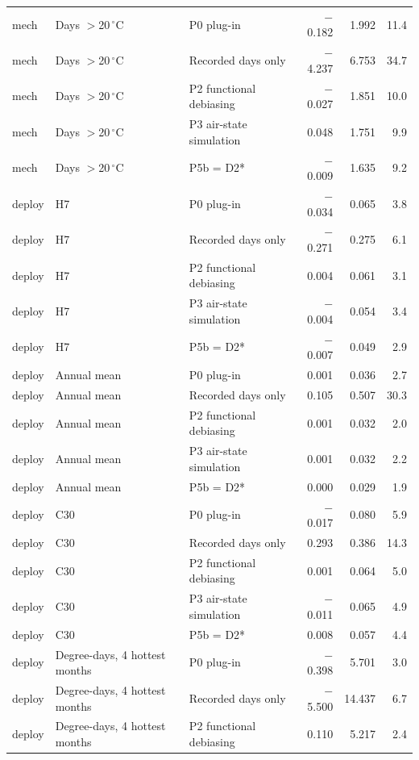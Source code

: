 \begin{table}
{\begin{tabular}{lllrrr}
mech & Days $>$20\,$^{\circ}$C & P0 plug-in & \ensuremath{-}0.182 & 1.992 & 11.4 \\
mech & Days $>$20\,$^{\circ}$C & Recorded days only & \ensuremath{-}4.237 & 6.753 & 34.7 \\
mech & Days $>$20\,$^{\circ}$C & P2 functional debiasing & \ensuremath{-}0.027 & 1.851 & 10.0 \\
mech & Days $>$20\,$^{\circ}$C & P3 air-state simulation & 0.048 & 1.751 & 9.9 \\
mech & Days $>$20\,$^{\circ}$C & P5b = D2* & \ensuremath{-}0.009 & 1.635 & 9.2 \\
deploy & H7 & P0 plug-in & \ensuremath{-}0.034 & 0.065 & 3.8 \\
deploy & H7 & Recorded days only & \ensuremath{-}0.271 & 0.275 & 6.1 \\
deploy & H7 & P2 functional debiasing & 0.004 & 0.061 & 3.1 \\
deploy & H7 & P3 air-state simulation & \ensuremath{-}0.004 & 0.054 & 3.4 \\
deploy & H7 & P5b = D2* & \ensuremath{-}0.007 & 0.049 & 2.9 \\
deploy & Annual mean & P0 plug-in & 0.001 & 0.036 & 2.7 \\
deploy & Annual mean & Recorded days only & 0.105 & 0.507 & 30.3 \\
deploy & Annual mean & P2 functional debiasing & 0.001 & 0.032 & 2.0 \\
deploy & Annual mean & P3 air-state simulation & 0.001 & 0.032 & 2.2 \\
deploy & Annual mean & P5b = D2* & 0.000 & 0.029 & 1.9 \\
deploy & C30 & P0 plug-in & \ensuremath{-}0.017 & 0.080 & 5.9 \\
deploy & C30 & Recorded days only & 0.293 & 0.386 & 14.3 \\
deploy & C30 & P2 functional debiasing & 0.001 & 0.064 & 5.0 \\
deploy & C30 & P3 air-state simulation & \ensuremath{-}0.011 & 0.065 & 4.9 \\
deploy & C30 & P5b = D2* & 0.008 & 0.057 & 4.4 \\
deploy & Degree-days, 4 hottest months & P0 plug-in & \ensuremath{-}0.398 & 5.701 & 3.0 \\
deploy & Degree-days, 4 hottest months & Recorded days only & \ensuremath{-}5.500 & 14.437 & 6.7 \\
deploy & Degree-days, 4 hottest months & P2 functional debiasing & 0.110 & 5.217 & 2.4 \\

\end{tabular}}
\end{table}
